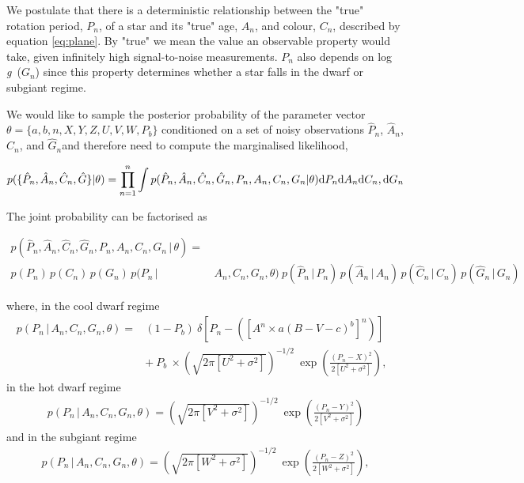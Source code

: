 \documentclass[12pt,preprint]{aastex}
\newcommand{\logg}{log \emph{g}~}
\newcommand{\ah}{$\hat{A}_n$}
\newcommand{\ph}{$\hat{P}_n$}
\newcommand{\ch}{$\hat{C}_n$}
\newcommand{\gh}{$\hat{G}_n$}
\begin{document}
We postulate that there is a deterministic relationship between the "true" rotation period, $P_n$, of a star and its "true" age, $A_n$, and colour, $C_n$, described by equation \ref{eq:plane}.
By "true" we mean the value an observable property would take, given infinitely high signal-to-noise measurements.
$P_n$ also depends on \logg($G_n$) since this property determines whether a star falls in the dwarf or subgiant regime.

We would like to sample the posterior probability of the parameter vector $\theta = \{a, b, n, X, Y, Z, U, V, W, P_b\}$ conditioned on a set of noisy observations \ph, \ah, \ch, and \gh and therefore need to compute the marginalised likelihood,

\begin{equation}
	p(\{\hat{P}_n,\hat{A}_n,\hat{C}_n,\hat{G}\}|\theta) =
	\prod_{n=1}^{n} \int p(\hat{P}_n,\hat{A}_n,\hat{C}_n,\hat{G}_n,P_n,A_n,C_n,G_n|\theta)
	{\rm d}P_n {\rm d}A_n {\rm d}C_n,{\rm d}G_n
\label{eq:fulll}
\end{equation}

The joint probability can be factorised as

\begin{align}
	p(\hat{P}_n,\hat{A}_n,\hat{C}_n,\hat{G}_n,P_n,A_n,C_n,G_n\,|\,\theta) = & \nonumber \\
	p(P_n)\,p(C_n)\,p(G_n)\,p(P_n\,| & \,A_n,C_n,G_n,\theta)\
        p(\hat{P}_n\,|\,P_n)\,p(\hat{A}_n\,|\,A_n)\,p(\hat{C}_n\,|\,C_n)\,p(\hat{G}_n\,|\,G_n)
\nonumber
\end{align}

where, in the cool dwarf regime
\begin{eqnarray}
p(P_n\,|\,A_n,C_n,G_n,\theta) =
	& (1-P_b)~\delta \left [P_n - \left(\left[A^n \times a(B-V - c)^b\right]^n\right) \right] \quad \\
	& +~P_b~\times \left(\sqrt{2\pi[U^2+\sigma^2]}\right)^{-1/2}~\exp\left({\frac{(P_n-X)^2}{2[U^2+\sigma^2]}}\right),
\end{eqnarray}
in the hot dwarf regime
\begin{eqnarray}
p(P_n\,|\,A_n,C_n,G_n,\theta) = \left(\sqrt{2\pi[V^2+\sigma^2]}\right)^{-1/2}~\exp\left({\frac{(P_n-Y)^2}{2[V^2+\sigma^2]}}\right)
\end{eqnarray}
and in the subgiant regime
\begin{eqnarray}
p(P_n\,|\,A_n,C_n,G_n,\theta) = \left(\sqrt{2\pi[W^2+\sigma^2]}\right)^{-1/2}~\exp\left({\frac{(P_n-Z)^2}{2[W^2+\sigma^2]}}\right),
\end{eqnarray}
\end{document}
